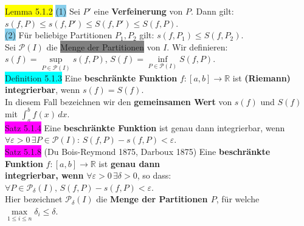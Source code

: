 \documentclass[10pt]{article}
\begin{document}
\colorbox{yellow}{Lemma 5.1.2} \colorbox{SkyBlue}{(1)} Sei \textcolor{NavyBlue}{$P'$}
                eine \textbf{Verfeinerung} von \textcolor{NavyBlue}{$P$}. Dann gilt: 
                \textcolor{NavyBlue}{
                $s(f,P)\leqslant s(f,P')\leqslant S(f,P')\leqslant S(f,P)$}.\\
        \indent \colorbox{SkyBlue}{(2)} Für beliebige Partitionen 
                \textcolor{NavyBlue}{$P_1,P_2$}
                 gilt: \textcolor{NavyBlue}{$s(f,P_1)\leqslant S(f,P_2)$}.\\
Sei \textcolor{NavyBlue}{$\mathcal{P}(I)$} die \colorbox{gray}{Menge der Partitionen} 
                von \textcolor{NavyBlue}{$I$}. Wir definieren: 
                \textcolor{NavyBlue}{$s(f)=\sup\limits_{P\in\mathcal{P}(I)}s(f,P)$},\quad 
                \textcolor{NavyBlue}{$S(f)=\inf\limits_{P\in\mathcal{P}(I)}S(f,P)$}. \\
\colorbox{cyan}{Definition 5.1.3} Eine \textbf{beschränkte Funktion} 
                \textcolor{NavyBlue}{$f:[a,b]\longrightarrow\mathbb{R}$} 
                ist \textbf{(Riemann) integrierbar}, wenn \textcolor{NavyBlue}{$s(f)=S(f)$}.\\ 
        \indent In diesem Fall 
                bezeichnen wir den \textbf{gemeinsamen Wert} 
                von \textcolor{NavyBlue}{$s(f)$} und 
                \textcolor{NavyBlue}{$S(f)$} mit 
                \textcolor{NavyBlue}{$\int_a^bf(x)\,dx$}.\\
\colorbox{magenta}{Satz 5.1.4} Eine \textbf{beschränkte Funktion} ist 
                genau dann integrierbar, wenn 
                \textcolor{NavyBlue}{$\forall\varepsilon>0\,\exists P\in\mathcal{P}(I)$}:
                \textcolor{NavyBlue}{$S(f,P)-s(f,P)<\varepsilon$}.\\
\colorbox{magenta}{Satz 5.1.8} (Du Bois-Reymond 1875, Darboux 1875) 
                Eine \textbf{beschränkte Funktion} 
                \textcolor{NavyBlue}{$f:[a,b]\longrightarrow\mathbb{R}$} 
                ist \textbf{genau dann \\
        \indent integrierbar, wenn} 
                \textcolor{NavyBlue}{$\forall\varepsilon>0\,\exists\delta>0$}, so dass: 
                \textcolor{NavyBlue}{
                $\forall P\in\mathcal{P}_\delta(I),\,S(f,P)-s(f,P)<\varepsilon$}.\\
        \indent Hier bezeichnet \textcolor{NavyBlue}{$\mathcal{P}_\delta(I)$} die 
                \textbf{Menge der Partitionen $P$}, für welche 
                \textcolor{NavyBlue}{
                $\max\limits_{1\leqslant i\leqslant n}\delta_i\leqslant\delta$}. \\
\end{document}
